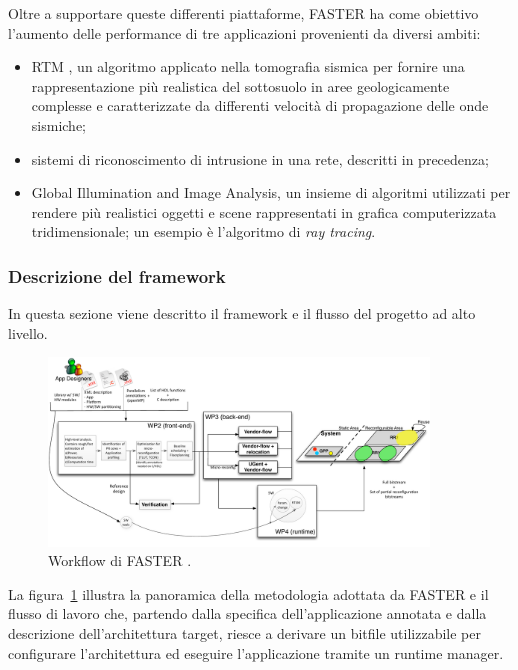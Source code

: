 Oltre a supportare queste differenti piattaforme, \ac{FASTER} ha come obiettivo 
l'aumento delle performance di tre applicazioni provenienti da diversi ambiti:
\begin{itemize}
 \item \acf{RTM} \cite{RTMArticle}, un algoritmo applicato nella tomografia sismica per 
fornire una rappresentazione più realistica del sottosuolo in aree 
geologicamente complesse e caratterizzate da differenti velocità di 
propagazione delle onde sismiche;
 \item sistemi di riconoscimento di intrusione in una rete, descritti in 
precedenza;
 \item Global Illumination and Image Analysis, un insieme di algoritmi 
utilizzati per rendere più realistici oggetti e scene rappresentati in grafica 
computerizzata tridimensionale; un esempio è l'algoritmo di \emph{ray tracing}.
\end{itemize}

\subsubsection{Descrizione del framework}
In questa sezione viene descritto il framework e il flusso del progetto ad  
alto livello.

\begin{figure}
 \begin{center}  
\includegraphics[width=0.9\textwidth]
{capitoli/figure/cap2/FASTERWorkflow.pdf}
\caption[Workflow di \acs{FASTER}]{Workflow di \acs{FASTER} \cite{FasterApproach}.}
\label{fig:FASTERWorkflow}
 \end{center}
\end{figure}

La figura~\ref{fig:FASTERWorkflow} illustra la panoramica della metodologia 
adottata da \ac{FASTER} e il flusso di lavoro che, partendo dalla specifica 
dell'applicazione annotata e dalla descrizione dell'architettura target, riesce 
a derivare un bitfile utilizzabile per configurare l'architettura ed eseguire 
l'applicazione tramite un runtime manager.

